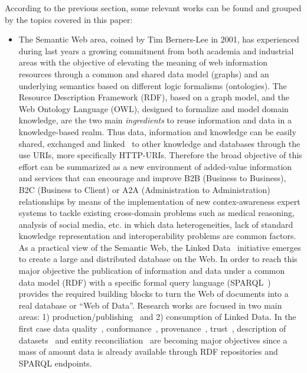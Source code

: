According to the previous section, some relevant works can be found and grouped by the topics covered in this paper:

\begin{itemize}
 \item  The Semantic Web area, coined by Tim Berners-Lee in 2001, has experienced during last years a growing 
 commitment from both academia and industrial areas  with the objective of elevating the meaning of web 
 information resources through a common and shared data model (graphs) and an underlying semantics based 
 on different logic formalisms (ontologies). The Resource Description Framework (RDF), based on a graph model, and the Web Ontology Language (OWL), designed to formalize and model domain knowledge, are the two main \textit{ingredients} to reuse information and data 
 in a knowledge-based realm. Thus data, information and knowledge can be easily shared, exchanged and linked~\cite{Maali_Cyganiak_2011} 
 to other knowledge and databases through the use URIs, more specifically HTTP-URIs. Therefore the broad objective of this effort can be summarized 
 as a new environment of added-value information and services that can encourage and improve B2B (Business to Business), B2C (Business to Client) or 
 A2A (Administration to Administration) relationships by means of the implementation of new contex-awareness expert systems to tackle existing 
 cross-domain problems such as medical reasoning, analysis of social media, etc. in which data heterogeneities, 
 lack of standard knowledge representation and interoperability problems are common factors. As a practical view of the Semantic Web, 
 the Linked Data~\cite{Berners-Lee-2006,Heath_Bizer_2011} initiative emerges to create a large and distributed database on the Web. 
 In order to reach this major objective the publication of information and data under a common data model (RDF) 
 with a specific formal query language (SPARQL~\cite{Sparql11}) provides the required building blocks to turn the Web of documents 
 into a real database or ``Web of Data''. Research works are focused in two main areas: 1) production/publishing~\cite{bizer07how} and 2) consumption of 
 Linked Data. In the first case data quality~\cite{bizer2007,wiqa,ld-quality,DBLP:journals/ws/BizerC09,lodq,link-qa}, conformance~\cite{DBLP:journals/ws/HoganUHCPD12}, 
 provenance~\cite{w3c-prov,DBLP:conf/ipaw/HartigZ10}, trust~\cite{Carroll05namedgraphs}, description of 
 datasets~\cite{void,Cyganiak08semanticsitemaps,ckanValidator} and entity reconciliation~\cite{Serimi,Maali_Cyganiak_2011} are 
 becoming major objectives since a mass of amount data is already available through RDF repositories and SPARQL endpoints. 
 

\end{itemize}
